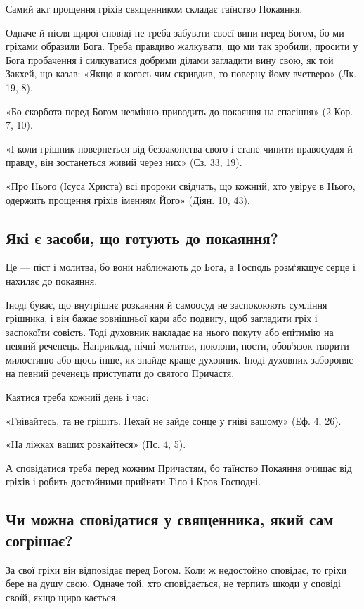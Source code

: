 \documentclass[main.tex]{subfiles}
\begin{document}
Самий акт прощення гріхів священником складає таїнство Покаяння.

Одначе й після щирої сповіді не треба забувати своєї вини перед Богом, бо ми гріхами образили Бога. Треба правдиво жалкувати, що ми так зробили, просити у Бога пробачення і силкуватися добрими ділами загладити вину свою, як той Закхей, що казав: «Якщо я когось чим скривдив, то поверну йому вчетверо» (Лк. 19, 8).

«Бо скорбота перед Богом незмінно приводить до покаяння на спасіння» (2 Кор. 7, 10).

«І коли грішник повернеться від беззаконства свого і стане чинити правосуддя й правду, він зостанеться живий через них» (Єз. 33, 19).

«Про Нього (Ісуса Христа) всі пророки свідчать, що кожний, хто увірує в Нього, одержить прощення гріхів іменням Його» (Діян. 10, 43).
 
\subsection{Які є засоби, що готують до покаяння?}

Це — піст і молитва, бо вони наближають до Бога, а Господь розм`якшує серце і нахиляє до покаяння.

Іноді буває, що внутрішнє розкаяння й самоосуд не заспокоюють сумління грішника, і він бажає зовнішньої кари або подвигу, щоб загладити гріх і заспокоїти совість. Тоді духовник накладає на нього покуту або епітимію на певний реченець. Наприклад, нічні молитви, поклони, пости, обов`язок творити милостиню або щось інше, як знайде краще духовник. Іноді духовник забороняє на певний реченець приступати до святого Причастя.

Каятися треба кожний день і час:

«Гнівайтесь, та не грішіть. Нехай не зайде сонце у гніві вашому» (Еф. 4, 26).

«На ліжках ваших розкайтеся» (Пс. 4, 5).

А сповідатися треба перед кожним Причастям, бо таїнство Покаяння очищає від гріхів і робить достойними прийняти Тіло і Кров Господні.

\subsection{Чи можна сповідатися у священника, який сам согрішає?}

За свої гріхи він відповідає перед Богом. Коли ж недостойно сповідає, то гріхи бере на душу свою. Одначе той, хто сповідається, не терпить шкоди у сповіді своїй, якщо щиро кається.
\end{document}

